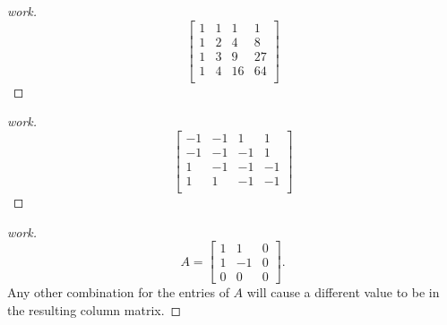 \documentclass{article}
\begin{document}
\begin{question}{1.3}{}
{\begin{enumerate}
\begin{proof}[work]
      \[
        \begin{bmatrix}
          1 & 1 & 1  & 1  \\
          1 & 2 & 4  & 8  \\
          1 & 3 & 9  & 27 \\
          1 & 4 & 16 & 64 \\
        \end{bmatrix}
      \]
    \end{proof}
    \begin{proof}[work]
      \[
        \begin{bmatrix}
          -1 & -1 & 1  & 1  \\
          -1 & -1 & -1 & 1  \\
          1  & -1 & -1 & -1 \\
          1  & 1  & -1 & -1 \\
        \end{bmatrix}
      \]
    \end{proof}
  \end{enumerate}}
  \begin{proof}[work]
    \[
      A = \begin{bmatrix}
        1 & 1  & 0 \\
        1 & -1 & 0 \\
        0 & 0  & 0
      \end{bmatrix}.
    \]
    Any other combination for the entries of $A$ will cause a different value to be in the resulting column matrix.
  \end{proof}
\end{question}
\end{document}
